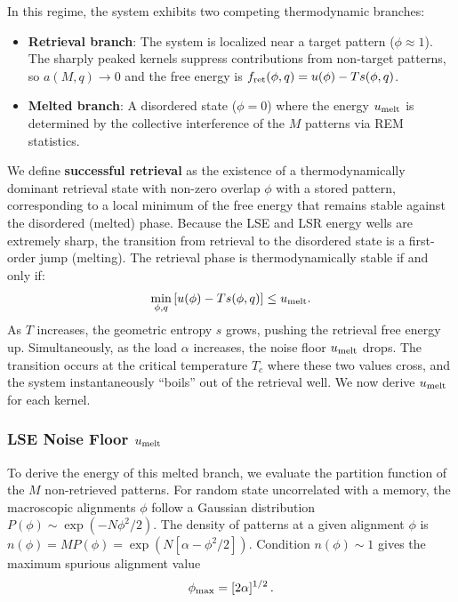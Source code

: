 \documentclass{article}
\theoremstyle{plain}
\theoremstyle{definition}
\theoremstyle{remark}
\begin{document}
In this regime, the system exhibits two competing thermodynamic branches:
\begin{itemize}
    \item \textbf{Retrieval branch}: The system is localized near a target pattern ($\phi \approx 1$). The sharply peaked kernels suppress contributions from non-target patterns, so $a(M,q) \to 0$ and the free energy is $f_{\rm ret}(\phi, q) = u(\phi) - T s(\phi, q)$.
    \item \textbf{Melted branch}: A disordered state ($\phi = 0$) where the energy $u_{\rm melt}$ is determined by the collective interference of the $M$ patterns via REM statistics.
\end{itemize}

We define \textbf{successful retrieval} as the existence of a thermodynamically dominant retrieval state with non-zero overlap $\phi$ with a stored pattern, corresponding to a local minimum of the free energy that remains stable against the disordered (melted) phase.
Because the LSE and LSR energy wells are extremely sharp, the transition from retrieval to the disordered state is a first-order jump (melting). The retrieval phase is thermodynamically stable if and only if:
\begin{equation}
    \min_{\phi, q} \left[ u(\phi) - T s(\phi, q) \right] \leq u_{\rm melt}.
\end{equation}
As $T$ increases, the geometric entropy $s$ grows, pushing the retrieval free energy up. Simultaneously, as the load $\alpha$ increases, the noise floor $u_{\rm melt}$ drops. The transition occurs at the critical temperature $T_c$ where these two values cross, and the system instantaneously ``boils'' out of the retrieval well. We now derive $u_{\rm melt}$ for each kernel.


\subsubsection{LSE Noise Floor $u_{\rm melt}$}

To derive the energy of this melted branch, we evaluate the partition function of the $M$ non-retrieved patterns. For random state  uncorrelated with a memory, the macroscopic alignments $\phi$ follow a Gaussian distribution $P(\phi) \sim \exp(-N\phi^2/2)$. The density of patterns at a given alignment $\phi$ is $n(\phi) = M P(\phi) = \exp(N[\alpha - \phi^2/2])$. Condition $n(\phi) \sim 1$ gives the maximum spurious alignment value 
\begin{equation}
    \phi_{\rm max} = [2\alpha]^{1/2}\,.
    \label{eq:max_spur}
\end{equation}
\end{document}

